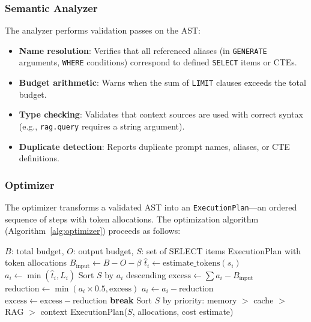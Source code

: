\documentclass[11pt,a4paper]{article}
\begin{document}
\subsubsection{Semantic Analyzer}

The analyzer performs validation passes on the AST:

\begin{itemize}[nosep]
  \item \textbf{Name resolution}: Verifies that all referenced aliases (in \texttt{GENERATE} arguments, \texttt{WHERE} conditions) correspond to defined \texttt{SELECT} items or CTEs.
  \item \textbf{Budget arithmetic}: Warns when the sum of \texttt{LIMIT} clauses exceeds the total budget.
  \item \textbf{Type checking}: Validates that context sources are used with correct syntax (e.g., \texttt{rag.query} requires a string argument).
  \item \textbf{Duplicate detection}: Reports duplicate prompt names, aliases, or CTE definitions.
\end{itemize}

\subsubsection{Optimizer}

The optimizer transforms a validated AST into an \texttt{ExecutionPlan}---an ordered sequence of steps with token allocations. The optimization algorithm (Algorithm~\ref{alg:optimizer}) proceeds as follows:

\begin{algorithm}[h]
\caption{SPL Token Budget Optimizer}
\label{alg:optimizer}
\begin{algorithmic}[1]
\Require $B$: total budget, $O$: output budget, $S$: set of SELECT items
\Ensure ExecutionPlan with token allocations
\State $B_{\text{input}} \gets B - O - \beta$
  \State $\hat{t}_i \gets \text{estimate\_tokens}(s_i)$
  \State $a_i \gets \min(\hat{t}_i, L_i)$ 
\EndFor
{}
  \State Sort $S$ by $a_i$ descending 
  \State $\text{excess} \gets \sum a_i - B_{\text{input}}$
    \State $\text{reduction} \gets \min(a_i \times 0.5, \text{excess})$
    \State $a_i \gets a_i - \text{reduction}$
    \State $\text{excess} \gets \text{excess} - \text{reduction}$
     \textbf{break} \EndIf
  \EndFor
\EndIf
\State Sort $S$ by priority: memory $>$ cache $>$ RAG $>$ context
\State \Return ExecutionPlan($S$, allocations, cost estimate)
\end{algorithmic}
\end{algorithm}
\end{document}
